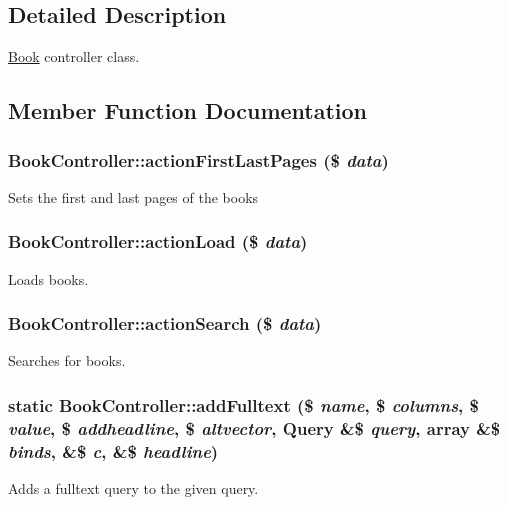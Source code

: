 \subsection{Detailed Description}
\hyperlink{classBook}{Book} controller class. 

\subsection{Member Function Documentation}
\hypertarget{classBookController_a171e02784e1684da6151682bfd76d850}{
\subsubsection[{actionFirstLastPages}]{\setlength{\rightskip}{0pt plus 5cm}BookController::actionFirstLastPages (\$ {\em data})}}
\label{classBookController_a171e02784e1684da6151682bfd76d850}
Sets the first and last pages of the books \hypertarget{classBookController_a6079dc1106ff410904978d50ca8d34a9}{
\subsubsection[{actionLoad}]{\setlength{\rightskip}{0pt plus 5cm}BookController::actionLoad (\$ {\em data})}}
\label{classBookController_a6079dc1106ff410904978d50ca8d34a9}
Loads books. \hypertarget{classBookController_a4504f609c873130b89fe8849621ea65e}{
\subsubsection[{actionSearch}]{\setlength{\rightskip}{0pt plus 5cm}BookController::actionSearch (\$ {\em data})}}
\label{classBookController_a4504f609c873130b89fe8849621ea65e}
Searches for books. \hypertarget{classBookController_a633024b63ec6ba13730a6d7852fc2637}{
\subsubsection[{addFulltext}]{\setlength{\rightskip}{0pt plus 5cm}static BookController::addFulltext (\$ {\em name}, \/  \$ {\em columns}, \/  \$ {\em value}, \/  \$ {\em addheadline}, \/  \$ {\em altvector}, \/  {\bf Query} \&\$ {\em query}, \/  array \&\$ {\em binds}, \/  \&\$ {\em c}, \/  \&\$ {\em headline})}}
\label{classBookController_a633024b63ec6ba13730a6d7852fc2637}
Adds a fulltext query to the given query.


